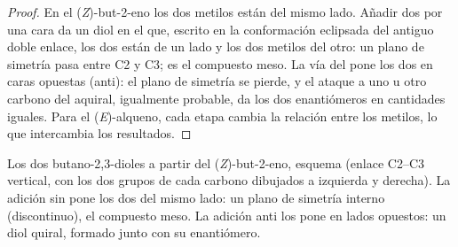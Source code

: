 \begin{proof}
En el (\textit{Z})-but-2-eno los dos metilos están del mismo lado. Añadir dos  por una cara
da un diol en el que, escrito en la conformación eclipsada del antiguo doble enlace, los
dos  están de un lado y los dos metilos del otro: un plano de simetría pasa entre
C2 y C3; es el compuesto meso. La vía del  pone los dos  en caras opuestas
(anti): el plano de simetría se pierde, y el ataque a uno u otro carbono del  aquiral,
igualmente probable, da los dos enantiómeros en cantidades iguales. Para el (\textit{E})-alqueno, cada
etapa cambia la relación entre los metilos, lo que intercambia los resultados.
\end{proof}

\begin{omfigure}

{\small Los dos butano-2,3-dioles a partir del (\textit{Z})-but-2-eno, esquema (enlace C2--C3
vertical, con los dos grupos de cada carbono dibujados a izquierda y derecha). La adición sin pone los dos
 del mismo lado: un plano de simetría interno (discontinuo), el compuesto meso. La adición anti
los pone en lados opuestos: un diol quiral, formado junto con su enantiómero.}
\end{omfigure}

